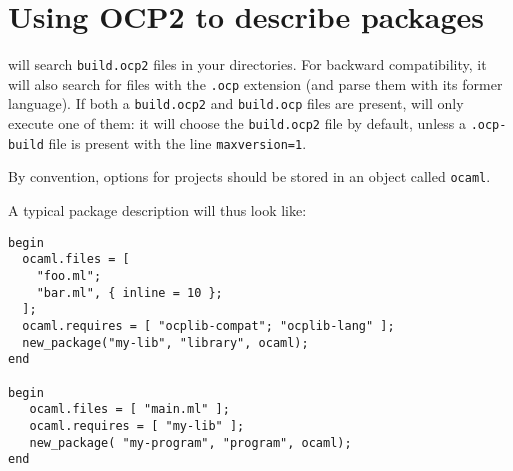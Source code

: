 \section{Using OCP2 to describe packages}

\ocpbuild{} will search {\tt build.ocp2} files in your
directories. For backward compatibility, it will also search for files
with the {\tt .ocp} extension (and parse them with its former
language). If both a {\tt build.ocp2} and {\tt build.ocp} files are
present, \ocpbuild{} will only execute one of them: it will choose the
{\tt build.ocp2} file by default, unless a {\tt .ocp-build} file is
present with the line {\tt maxversion=1}.

By convention, options for projects should be stored in an object
called {\tt ocaml}.

A typical package description will thus look like:

\begin{verbatim}
begin
  ocaml.files = [
    "foo.ml";
    "bar.ml", { inline = 10 };
  ];
  ocaml.requires = [ "ocplib-compat"; "ocplib-lang" ];
  new_package("my-lib", "library", ocaml);
end

begin
   ocaml.files = [ "main.ml" ];
   ocaml.requires = [ "my-lib" ];
   new_package( "my-program", "program", ocaml);
end
\end{verbatim}
